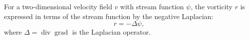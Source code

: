 For a two-dimensional velocity field $v$ with stream function $\psi$, the vorticity $r$ is expressed in terms of the stream function by the negative Laplacian:
$$r = -\Delta \psi,$$
where $\Delta = \operatorname{div} \operatorname{grad}$ is the Laplacian operator.
